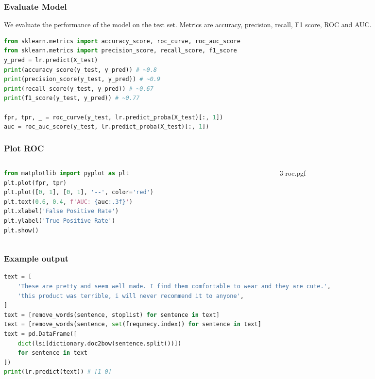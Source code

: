 \documentclass[beamer, en, version=2.0]{huangfusl-template}
\begin{document}
    \begin{frame}[fragile]
        \frametitle{Evaluate Model}

        We evaluate the performance of the model on the test set. Metrics are accuracy, precision, recall, F1 score, ROC and AUC.

\begin{lstlisting}[language=python, breaklines]
from sklearn.metrics import accuracy_score, roc_curve, roc_auc_score
from sklearn.metrics import precision_score, recall_score, f1_score
y_pred = lr.predict(X_test)
print(accuracy_score(y_test, y_pred)) # ~0.8
print(precision_score(y_test, y_pred)) # ~0.9
print(recall_score(y_test, y_pred)) # ~0.67
print(f1_score(y_test, y_pred)) # ~0.77

fpr, tpr, _ = roc_curve(y_test, lr.predict_proba(X_test)[:, 1])
auc = roc_auc_score(y_test, lr.predict_proba(X_test)[:, 1])
\end{lstlisting}
    \end{frame}

    \begin{frame}[fragile]
        \frametitle{Plot ROC}

        \begin{columns}
            \begin{column}{0.5\textwidth}
\begin{lstlisting}[language=python, breaklines]
from matplotlib import pyplot as plt
plt.plot(fpr, tpr)
plt.plot([0, 1], [0, 1], '--', color='red')
plt.text(0.6, 0.4, f'AUC: {auc:.3f}')
plt.xlabel('False Positive Rate')
plt.ylabel('True Positive Rate')
plt.show()
\end{lstlisting}
            \end{column}
            \begin{column}{0.5\textwidth}
                \begin{figure}
                    {3-roc.pgf}
                \end{figure}
            \end{column}
        \end{columns}

    \end{frame}

    \begin{frame}[fragile]
        \frametitle{Example output}

\begin{lstlisting}[language=python, breaklines]
text = [
    'These are pretty and seem well made. I find them comfortable to wear and they are cute.',
    'this product was terrible, i will never recommend it to anyone',
]
text = [remove_words(sentence, stoplist) for sentence in text]
text = [remove_words(sentence, set(frequnecy.index)) for sentence in text]
text = pd.DataFrame([
    dict(lsi[dictionary.doc2bow(sentence.split())])
    for sentence in text
])
print(lr.predict(text)) # [1 0]
\end{lstlisting}
    \end{frame}

    \begin{frame}
        \mythanks
    \end{frame}
\end{document}
